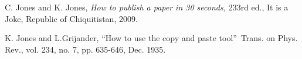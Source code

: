 \documentclass[10pt,conference,a4paper]{IEEEtran}
\begin{document}


\begin{thebibliography}{9}                                                                                                %
    C. Jones and K. Jones, \emph{How to publish a paper in 30
seconds,} 233rd ed., It is a Joke, Republic of Chiquitistan, 2009.

    K. Jones and L.Grijander, \textquotedblleft How to use
the copy and paste tool\textquotedblright\ Trans. on Phys. Rev., vol. 234, no.
7, pp. 635-646, Dec. 1935.
\end{thebibliography}
\end{document}

